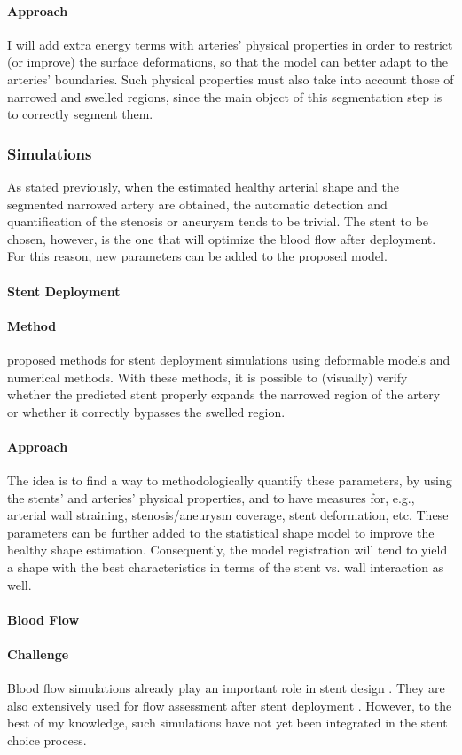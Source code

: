 \documentclass[a4paper]{article}
\newcommand{\challenge}{\paragraph{Challenge}}
\newcommand{\method}{\paragraph{Method}}
\newcommand{\approach}{\paragraph{Approach}}
\begin{document}
\approach
I will add extra energy terms with arteries' physical properties in order to restrict (or improve) the surface deformations, so that the model can better adapt to the arteries' boundaries. Such physical properties must also take into account those of narrowed and swelled regions, since the main object of this segmentation step is to correctly segment them.

\subsubsection{Simulations}

As stated previously, when the estimated healthy arterial shape and the segmented narrowed artery are obtained, the automatic detection and quantification of the stenosis or aneurysm tends to be trivial. The stent to be chosen, however, is the one that will optimize the blood flow after deployment. For this reason, new parameters can be added to the proposed model.

\paragraph{Stent Deployment}

\method
\citet{Florez,deBeule} proposed methods for stent deployment simulations using deformable models and numerical methods. With these methods, it is possible to (visually) verify whether the predicted stent properly expands the narrowed region of the artery or whether it correctly bypasses the swelled region. 

\approach
The idea is to find a way to methodologically quantify these parameters, by using the stents' and arteries' physical properties, and to have measures for, e.g., arterial wall straining, stenosis/aneurysm coverage, stent deformation, etc. These parameters can be further added to the statistical shape model to improve the healthy shape estimation. Consequently, the model registration will tend to yield a shape with the best characteristics in terms of the stent vs. wall interaction as well.

\paragraph{Blood Flow}

\challenge
Blood flow simulations already play an important role in stent design \citep{deBeule}. They are also extensively used for flow assessment after stent deployment \citep{Vuk,Gori}. However, to the best of my knowledge, such simulations have not yet been integrated in the stent choice process. 
\end{document}
